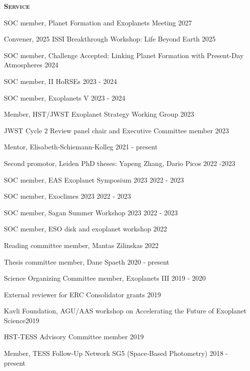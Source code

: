 \documentclass[12pt,letterpaper]{article}
\begin{document}
\textbf{\textsc{Service}} 
\begin{compactitem}[]
\item {SOC member, Planet Formation and Exoplanets Meeting \hfill 2027}
\item {Convener, 2025 ISSI Breakthrough Workshop: Life Beyond Earth \hfill 2025}
\item {SOC member, Challenge Accepted: Linking Planet Formation with Present-Day Atmospheres \hfill 2024}
\item {SOC member, II HoRSEs \hfill 2023 - 2024}
\item {SOC member, Exoplanets V \hfill 2023 - 2024}
\item {Member, HST/JWST Exoplanet Strategy Working Group \hfill 2023}
\item {JWST Cycle 2 Review panel chair and Executive Committee member \hfill 2023}
\item{Mentor, Elisabeth-Schiemann-Kolleg \hfill 2021 - present}
\item {Second promotor, Leiden PhD theses: Yapeng Zhang, Dario Picos \hfill 2022 -2023}
\item {SOC member, EAS Exoplanet Symposium 2023 \hfill 2022 - 2023}
\item {SOC member, Exoclimes 2023 \hfill 2022 - 2023}
\item {SOC member, Sagan Summer Workshop 2023 \hfill 2022 - 2023}
\item {SOC member, ESO disk and exoplanet workshop \hfill 2022}
\item {Reading committee member, Mantas Zilinskas \hfill 2022}
\item {Thesis committee member, Dane Spaeth \hfill 2020 -  present}
\item {Science Organizing Committee member, Exoplanets III \hfill 2019 - 2020}
\item {External reviewer for ERC Consolidator grants \hfill 2019}
\item {Kavli Foundation, AGU/AAS workshop on Accelerating the Future of Exoplanet Science\hfill 2019}
\item {HST-TESS Advisory Committee member \hfill 2019}
\item {Member, TESS Follow-Up Network SG5 (Space-Based Photometry) \hfill 2018 - present}

\end{compactitem}
\end{document}

